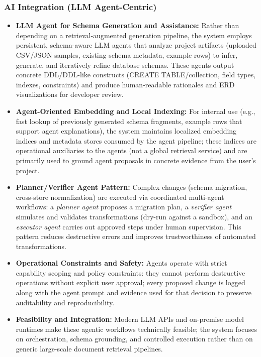 \subsubsection*{AI Integration (LLM Agent-Centric)}
\begin{itemize}
    \item \textbf{LLM Agent for Schema Generation and Assistance:} Rather than depending on a retrieval-augmented generation pipeline, the system employs persistent, schema-aware LLM agents that analyze project artifacts (uploaded CSV/JSON samples, existing schema metadata, example rows) to infer, generate, and iteratively refine database schemas. These agents output concrete DDL/DDL-like constructs (CREATE TABLE/collection, field types, indexes, constraints) and produce human-readable rationales and ERD visualizations for developer review.
    \item \textbf{Agent-Oriented Embedding and Local Indexing:} For internal use (e.g., fast lookup of previously generated schema fragments, example rows that support agent explanations), the system maintains localized embedding indices and metadata stores consumed by the agent pipeline; these indices are operational auxiliaries to the agents (not a global retrieval service) and are primarily used to ground agent proposals in concrete evidence from the user's project.
    \item \textbf{Planner/Verifier Agent Pattern:} Complex changes (schema migration, cross-store normalization) are executed via coordinated multi-agent workflows: a \emph{planner agent} proposes a migration plan, a \emph{verifier agent} simulates and validates transformations (dry-run against a sandbox), and an \emph{executor agent} carries out approved steps under human supervision. This pattern reduces destructive errors and improves trustworthiness of automated transformations.
    \item \textbf{Operational Constraints and Safety:} Agents operate with strict capability scoping and policy constraints: they cannot perform destructive operations without explicit user approval; every proposed change is logged along with the agent prompt and evidence used for that decision to preserve auditability and reproducibility.
    \item \textbf{Feasibility and Integration:} Modern LLM APIs and on-premise model runtimes make these agentic workflows technically feasible; the system focuses on orchestration, schema grounding, and controlled execution rather than on generic large-scale document retrieval pipelines.
\end{itemize}

